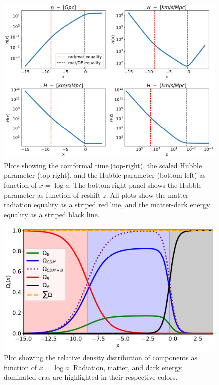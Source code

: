 \documentclass[10pt, a4paper]{article}
\begin{document}
\begin{figure}[H]
    \centering
    \includegraphics[scale=0.5]{../m1_figs/H.pdf}
    \caption{Plots showing the comformal time (top-right), the scaled Hubble parameter (top-right), and the Hubble parameter (bottom-left) as function of $x=\log{a}$. The bottom-right panel shows the Hubble parameter as function of reshift $z$. All plots show the matter-radiation equality as a striped red line, and the matter-dark energy equality as a striped black line.}
    \label{fig:H}
\end{figure}


\begin{figure}[H]
    \centering
    \includegraphics[scale=0.5]{../m1_figs/Omegas.pdf}
    \caption{Plot showing the relative density distribution of components as function of $x=\log{a}$. Radiation, matter, and dark energy dominated eras are highlighted in their respective colors.}
    \label{fig:Omegas}
\end{figure}
\end{document}
